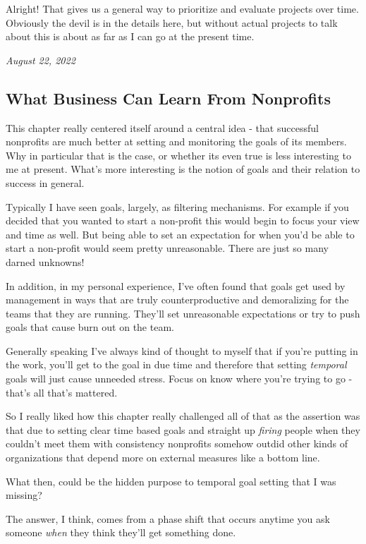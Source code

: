 \documentclass[10pt,a5paper]{book}
\begin{document}
Alright! That gives us a general way to prioritize and evaluate projects over time. Obviously the devil is in the details here, but without actual projects to talk about this is about as far as I can go at the present time. 

\textit{August 22, 2022}

\subsection{What Business Can Learn From Nonprofits}
This chapter really centered itself around a central idea - that successful nonprofits are much better at setting and monitoring the goals of its members. Why in particular that is the case, or whether its even true is less interesting to me at present. What's more interesting is the notion of goals and their relation to success in general. 

Typically I have seen goals, largely, as filtering mechanisms. For example if you decided that you wanted to start a non-profit this would begin to focus your view and time as well. But being able to set an expectation for when you'd be able to start a non-profit would seem pretty unreasonable. There are just so many darned unknowns! 

In addition, in my personal experience, I've often found that goals get used by management in ways that are truly counterproductive and demoralizing for the teams that they are running. They'll set unreasonable expectations or try to push goals that cause burn out on the team. 

Generally speaking I've always kind of thought to myself that if you're putting in the work, you'll get to the goal in due time and therefore that setting \textit{temporal} goals will just cause unneeded stress. Focus on know where you're trying to go - that's all that's mattered. 

So I really liked how this chapter really challenged all of that as the assertion was that due to setting clear time based goals and straight up \textit{firing} people when they couldn't meet them with consistency nonprofits somehow outdid other kinds of organizations that depend more on external measures like a bottom line. 

What then, could be the hidden purpose to temporal goal setting that I was missing? \linebreak

The answer, I think, comes from a phase shift that occurs anytime you ask someone \textit{when} they think they'll get something done. 
\end{document}
